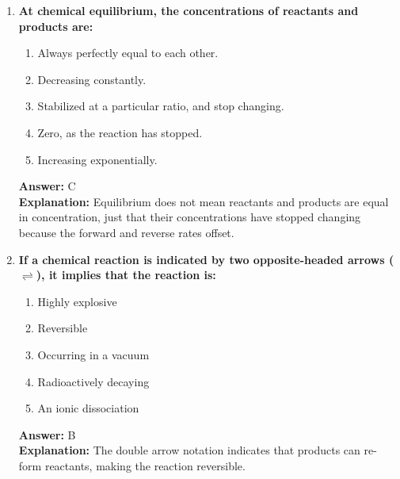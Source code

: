\documentclass[11pt, a4paper]{article}
\begin{document}
\begin{enumerate}
\item \textbf{At chemical equilibrium, the concentrations of reactants and products are:}
\begin{enumerate}[label=\Alph*.]
    \item Always perfectly equal to each other.
    \item Decreasing constantly.
    \item Stabilized at a particular ratio, and stop changing.
    \item Zero, as the reaction has stopped.
    \item Increasing exponentially.
\end{enumerate}
\textbf{Answer:} C \\
\textbf{Explanation:} Equilibrium does not mean reactants and products are equal in concentration, just that their concentrations have stopped changing because the forward and reverse rates offset.

\item \textbf{If a chemical reaction is indicated by two opposite-headed arrows ($\rightleftharpoons$), it implies that the reaction is:}
\begin{enumerate}[label=\Alph*.]
    \item Highly explosive
    \item Reversible
    \item Occurring in a vacuum
    \item Radioactively decaying
    \item An ionic dissociation
\end{enumerate}
\textbf{Answer:} B \\
\textbf{Explanation:} The double arrow notation indicates that products can re-form reactants, making the reaction reversible.

\end{enumerate}
\end{document}
